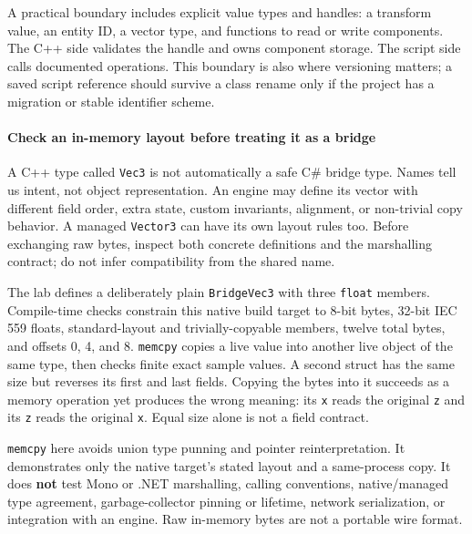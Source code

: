 A practical boundary includes explicit value types and handles: a transform value, an entity ID, a vector type, and functions to read or write components. The C++ side validates the handle and owns component storage. The script side calls documented operations. This boundary is also where versioning matters; a saved script reference should survive a class rename only if the project has a migration or stable identifier scheme.

\paragraph{Check an in-memory layout before treating it as a bridge}\label{06-engine-ii-ch040-check-an-in-memory-layout-before-treating-it-as-a-bridge}

\hypertarget{06-engine-ii-ch040-check-an-in-memory-layout-before-treating-it-as-a-bridge}{}

A C++ type called \texttt{Vec3} is not automatically a safe C\# bridge type. Names tell us intent, not object representation. An engine may define its vector with different field order, extra state, custom invariants, alignment, or non-trivial copy behavior. A managed \texttt{Vector3} can have its own layout rules too. Before exchanging raw bytes, inspect both concrete definitions and the marshalling contract; do not infer compatibility from the shared name.

The lab defines a deliberately plain \texttt{BridgeVec3} with three \texttt{float} members. Compile-time checks constrain this native build target to 8-bit bytes, 32-bit IEC 559 floats, standard-layout and trivially-copyable members, twelve total bytes, and offsets 0, 4, and 8. \texttt{memcpy} copies a live value into another live object of the same type, then checks finite exact sample values. A second struct has the same size but reverses its first and last fields. Copying the bytes into it succeeds as a memory operation yet produces the wrong meaning: its \texttt{x} reads the original \texttt{z} and its \texttt{z} reads the original \texttt{x}. Equal size alone is not a field contract.

\texttt{memcpy} here avoids union type punning and pointer reinterpretation. It demonstrates only the native target's stated layout and a same-process copy. It does \textbf{not} test Mono or .NET marshalling, calling conventions, native/managed type agreement, garbage-collector pinning or lifetime, network serialization, or integration with an engine. Raw in-memory bytes are not a portable wire format.

